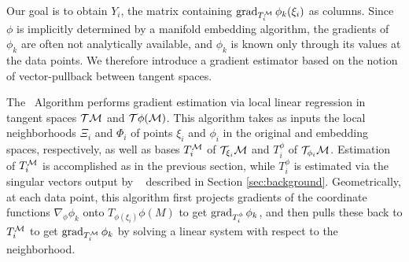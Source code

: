Our goal is to obtain $Y_i$, the matrix containing $\operatorname{grad}_{T_i^{\cal M}}\phi_k (\xi_i)$ as columns.
Since $\phi$ is implicitly determined by a manifold embedding algorithm, the gradients of $\phi_k$ are often not analytically available, and $\phi_k$ is known only through its values at the data points.
We therefore introduce a gradient estimator based on the notion of vector-pullback between tangent spaces.

The \dpullalg~Algorithm performs gradient estimation via local linear regression in tangent spaces ${\cal T} {\cal M}$ and ${\cal T} \phi({\cal M})$.
This algorithm takes as inputs the local neighborhoods $\Xi_i$ and $\Phi_i$ of points $\xi_i$ and $\phi_i$ in the original and embedding spaces, respectively, as well as bases $T_i^{\cal M}$ of ${\cal T}_{\xi_i}{\cal M}$ and $T_i^\phi$ of ${\cal T}_{\phi_i} {\cal M}$.
Estimation of $T_i^{\cal M}$ is accomplished as in the previous section, while $T_i^\phi$ is estimated via the singular vectors output by \rmalg~ \citep{2013arXiv1305.7255P} described in Section \ref{sec:background}.
Geometrically, at each data point, this algorithm first projects gradients of the coordinate functions $\nabla_{\phi} \phi_k$ onto $T_{\phi(\xi_i)} \phi(M)$ to get $\operatorname{grad}_{T_i^\phi} \phi_k$, and then pulls these back to $T_i^{\cal M}$ to get $\operatorname{grad}_{T_i^{\cal M}} \phi_k$ by solving a linear system with respect to the neighborhood.


